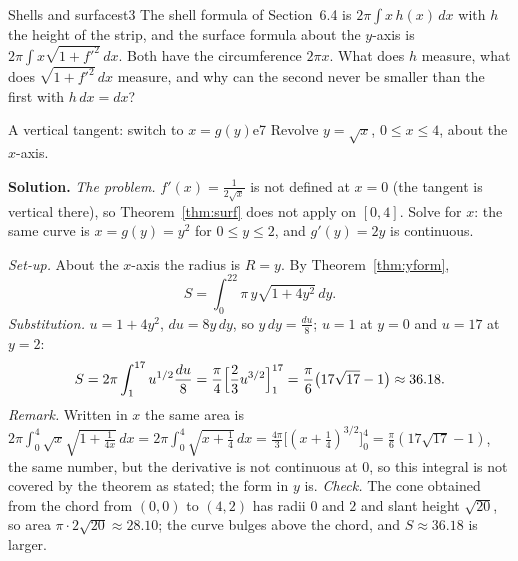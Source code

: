 \documentclass[11pt]{article}
\begin{document}
\begin{think}{Shells and surfaces}{t3}
The shell formula of Section~6.4 is $2\pi\int x\,h(x)\,dx$ with $h$ the height of the strip, and the surface formula about the $y$-axis is $2\pi\int x\sqrt{1+f'^2}\,dx$. Both have the circumference $2\pi x$. What does $h$ measure, what does $\sqrt{1+f'^2}\,dx$ measure, and why can the second never be smaller than the first with $h\,dx=dx$?
\end{think}

\begin{exmp}{A vertical tangent: switch to $x=g(y)$}{e7}
Revolve $y=\sqrt x$, $0\le x\le4$, about the $x$-axis.

\textbf{Solution.} \emph{The problem.} $f'(x)=\frac1{2\sqrt x}$ is not defined at $x=0$ (the tangent is vertical there), so Theorem~\ref{thm:surf} does not apply on $[0,4]$. Solve for $x$: the same curve is $x=g(y)=y^2$ for $0\le y\le2$, and $g'(y)=2y$ is continuous.

\emph{Set-up.} About the $x$-axis the radius is $R=y$. By Theorem~\ref{thm:yform},
\[
S=\int_0^22\pi\,y\sqrt{1+4y^2}\,dy .
\]
\emph{Substitution.} $u=1+4y^2$, $du=8y\,dy$, so $y\,dy=\frac{du}8$; $u=1$ at $y=0$ and $u=17$ at $y=2$:
\[
S=2\pi\int_1^{17}u^{1/2}\frac{du}8=\frac\pi4\Bigl[\frac23u^{3/2}\Bigr]_1^{17}=\frac\pi6\bigl(17\sqrt{17}-1\bigr)\approx36.18 .
\]
\emph{Remark.} Written in $x$ the same area is $2\pi\int_0^4\sqrt x\sqrt{1+\frac1{4x}}\,dx=2\pi\int_0^4\sqrt{x+\frac14}\,dx=\frac{4\pi}3\bigl[(x+\tfrac14)^{3/2}\bigr]_0^4=\frac\pi6(17\sqrt{17}-1)$, the same number, but the derivative is not continuous at $0$, so this integral is not covered by the theorem as stated; the form in $y$ is.
\emph{Check.} The cone obtained from the chord from $(0,0)$ to $(4,2)$ has radii $0$ and $2$ and slant height $\sqrt{20}$, so area $\pi\cdot2\sqrt{20}\approx28.10$; the curve bulges above the chord, and $S\approx36.18$ is larger.


\end{exmp}
\end{document}
